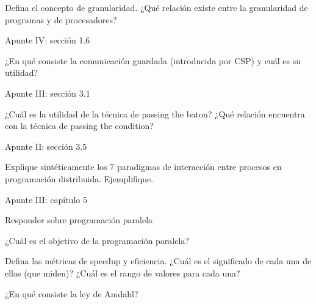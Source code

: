 \documentclass[a4paper, 10pt]{article}
\newenvironment{main_question}
	{\noindent\begin{enumerate}[resume=series-name]\bfseries}
	{\end{enumerate}}
\newenvironment{sub_questions}
	{\noindent\begin{enumerate}[label=\emph{\alph*}), leftmargin=0cm]}
	{\end{enumerate}}
\newenvironment{answer}
	{\noindent\par\normalfont}
	{}
\begin{document}
\begin{main_question}
\item Defina el concepto de granularidad. ¿Qué relación existe entre la granularidad de programas y de procesadores?
\end{main_question}
\begin{answer}
Apunte IV: sección 1.6
\end{answer}
\begin{main_question}
\item ¿En qué consiste la comunicación guardada (introducida por CSP) y cuál es su utilidad?
\end{main_question}
\begin{answer}
Apunte III: sección 3.1
\end{answer}
\begin{main_question}
\item ¿Cuál es la utilidad de la técnica de passing the baton? ¿Qué relación encuentra con la técnica de 
passing the condition?
\end{main_question}
\begin{answer}
Apunte II: sección 3.5
\end{answer}
\begin{main_question}
\item Explique sintéticamente los 7 paradigmas de interacción entre procesos en programación distribuida. Ejemplifique.
\end{main_question}
\begin{answer}
Apunte III: capítulo 5
\end{answer}
\begin{main_question}
\item Responder sobre programación paralela
\begin{sub_questions}
	\item ¿Cuál es el objetivo de la programación paralela?
	\item Defina las métricas de speedup y eficiencia. ¿Cuál es el significado de cada una de ellas (que miden)? 
	¿Cuál es el rango de valores para cada una?
	\item ¿En qué consiste la ley de Amdahl?
\end{sub_questions}
\end{main_question}
\end{document}
